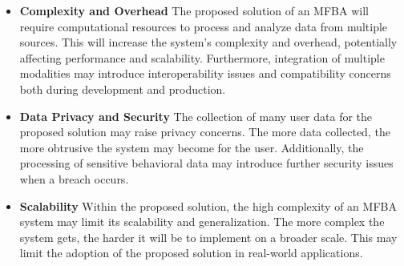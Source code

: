 \begin{itemize}
    \item \textbf{Complexity and Overhead}
    The proposed solution of an MFBA will require computational resources to process and analyze data from multiple sources. This will increase the system's complexity and overhead, potentially affecting performance and scalability. Furthermore, integration of multiple modalities may introduce interoperability issues and compatibility concerns both during development and production.

    \item \textbf{Data Privacy and Security}
    The collection of many user data for the proposed solution may raise privacy concerns. The more data collected, the more obtrusive the system may become for the user. Additionally, the processing of sensitive behavioral data may introduce further security issues when a breach occurs.
    
    \item \textbf{Scalability}
    Within the proposed solution, the high complexity of an MFBA system may limit its scalability and generalization. The more complex the system gets, the harder it will be to implement on a broader scale. This may limit the adoption of the proposed solution in real-world applications.

\end{itemize}
